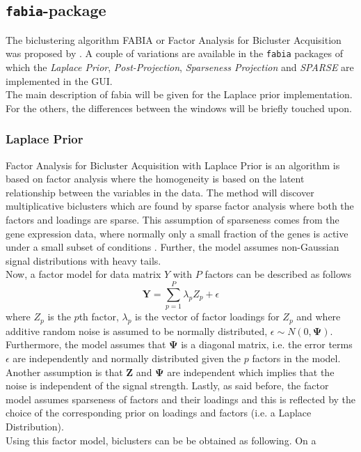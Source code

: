 \documentclass[a4paper]{article}\usepackage[]{graphicx}\usepackage[]{color}
\begin{document}
\subsection{\texttt{fabia}-package}
The biclustering algorithm FABIA or Factor Analysis for Bicluster Acquisition
was proposed by \citet{Hochreiter2010}. A couple of variations are
available in the \verb|fabia| packages of which the {\it Laplace Prior}, {\it
Post-Projection}, {\it Sparseness Projection} and {\it SPARSE} are implemented
in the GUI. \\
The main description of fabia will be given for the Laplace prior
implementation. For the others, the differences between the windows will be
briefly touched upon. 
\subsubsection{Laplace Prior}
Factor Analysis for Bicluster Acquisition with Laplace Prior is an algorithm is
based on factor analysis where the homogeneity is based on the latent
relationship between the variables in the data. The method will discover
multiplicative biclusters which are found by sparse factor analysis where both
the factors and loadings are sparse. This assumption of sparseness comes from
the gene expression data, where normally only a small fraction of the genes is
active under a small subset of conditions \citep{Khamiakova2013}. Further, the
model assumes non-Gaussian signal distributions with heavy tails.\\
Now, a factor model for data matrix $Y$ with $P$ factors can be described as
follows
$$
\mathbf{Y}= \sum_{p=1}^P \lambda_p Z_p + \epsilon 
$$
where $Z_p$ is the $p$th factor, $\lambda_p$ is the vector of factor loadings
for $Z_p$ and where additive random noise is assumed to be normally distributed, 
$\epsilon \sim N(0,\boldsymbol\Psi)$. Furthermore, the model assumes that
$\boldsymbol\Psi$ is a diagonal matrix, i.e. the error terms $\epsilon$ are
independently and normally distributed given the $p$ factors in the model.
Another assumption is that $\mathbf{Z}$ and $\boldsymbol\Psi$ are independent
which implies that the noise is independent of the signal strength. Lastly,
as said before, the factor model assumes sparseness of factors and their
loadings and this is reflected by the choice of the corresponding prior on
loadings and factors (i.e. a Laplace Distribution).\\
Using this factor model, biclusters can be be obtained as following. On a
\end{document}
